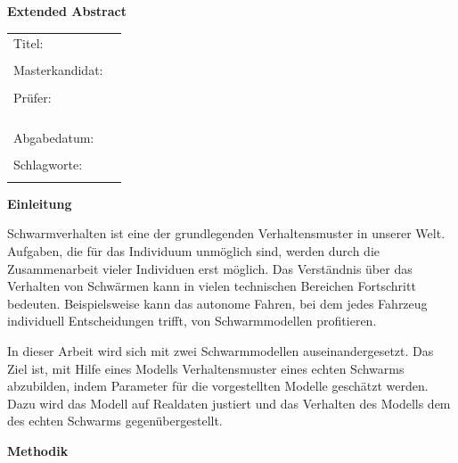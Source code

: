 \thispagestyle{plain}
\cleardoublepage
{}
{}
\begin{refsection}

\vspace*{11pt}
\begin{center}
	{\LARGE \textbf{\textsf{Extended Abstract}}}
\end{center}

\bigskip
\begin{center}
	\begin{tabular}{p{3.2cm}p{9.6cm}}
		Titel: & \thema \\
		& \\
		Masterkandidat: & \autor \\
		& \\
		Prüfer: & \firmaA \\ & \firmaB \\[1.1ex] & \prueferA  \\[.5ex]
		&  \prueferB \\
		& \\
		Abgabedatum: & \abgabedatum \\
		& \\
		Schlagworte: & \schlagworte \\
		& \\
	\end{tabular}
\end{center}


\bigskip

\noindent
\textbf{\textsf{Einleitung}}
\vspace*{3pt}

Schwarmverhalten ist eine der grundlegenden Verhaltensmuster in unserer Welt. 
Aufgaben, die für das Individuum unmöglich sind, werden durch die Zusammenarbeit vieler Individuen erst möglich.
Das Verständnis über das Verhalten von Schwärmen kann in vielen technischen Bereichen Fortschritt bedeuten.
Beispielsweise kann das autonome Fahren, bei dem jedes Fahrzeug individuell Entscheidungen trifft, von Schwarmmodellen profitieren.

In dieser Arbeit wird sich mit zwei Schwarmmodellen auseinandergesetzt. Das Ziel ist, mit Hilfe eines Modells Verhaltensmuster eines echten Schwarms abzubilden, indem Parameter für die vorgestellten Modelle geschätzt werden. Dazu wird das Modell auf Realdaten justiert und das Verhalten des Modells dem des echten Schwarms gegenübergestellt.

\vspace*{3pt}
\textbf{\textsf{Methodik}}
\vspace*{3pt}


\end{refsection}
